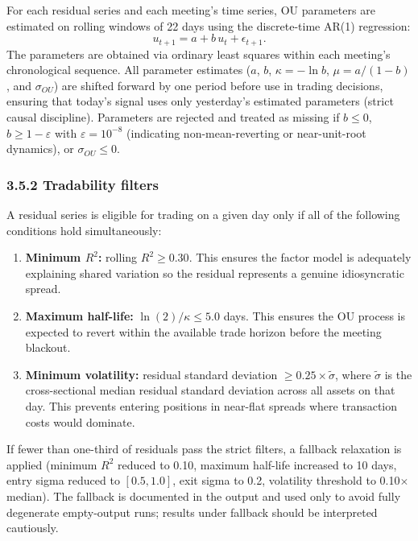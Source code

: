 For each residual series and each meeting's time series, OU parameters are estimated on rolling windows of 22 days using the discrete-time AR(1) regression:
\[
u_{t+1} = a + b \, u_t + \epsilon_{t+1}.
\]
The parameters are obtained via ordinary least squares within each meeting's chronological sequence. All parameter estimates ($a$, $b$, $\kappa = -\ln b$, $\mu = a/(1-b)$, and $\sigma_{OU}$) are shifted forward by one period before use in trading decisions, ensuring that today's signal uses only yesterday's estimated parameters (strict causal discipline). Parameters are rejected and treated as missing if $b \leq 0$, $b \geq 1 - \varepsilon$ with $\varepsilon = 10^{-8}$ (indicating non-mean-reverting or near-unit-root dynamics), or $\sigma_{OU} \leq 0$.

\subsubsection*{3.5.2 Tradability filters}

A residual series is eligible for trading on a given day only if all of the following conditions hold simultaneously:

\begin{enumerate}
    \item \textbf{Minimum $R^2$:} rolling $R^2 \geq 0.30$. This ensures the factor model is adequately explaining shared variation so the residual represents a genuine idiosyncratic spread.
    \item \textbf{Maximum half-life:} $\ln(2)/\kappa \leq 5.0$ days. This ensures the OU process is expected to revert within the available trade horizon before the meeting blackout.
    \item \textbf{Minimum volatility:} residual standard deviation $\geq 0.25 \times \widetilde{\sigma}$, where $\widetilde{\sigma}$ is the cross-sectional median residual standard deviation across all assets on that day. This prevents entering positions in near-flat spreads where transaction costs would dominate.
\end{enumerate}

If fewer than one-third of residuals pass the strict filters, a fallback relaxation is applied (minimum $R^2$ reduced to 0.10, maximum half-life increased to 10 days, entry sigma reduced to $[0.5, 1.0]$, exit sigma to 0.2, volatility threshold to 0.10$\times$ median). The fallback is documented in the output and used only to avoid fully degenerate empty-output runs; results under fallback should be interpreted cautiously.

